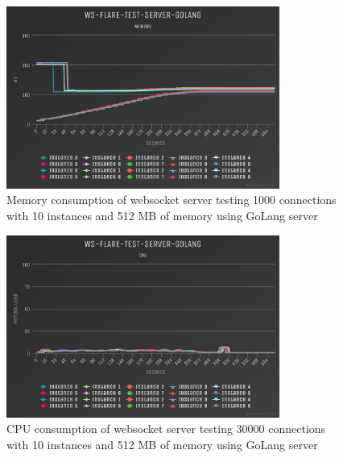 \begin{figure}[H]
  \centering
    \includegraphics[width=0.8\textwidth]{figures/experiments/experiment-1/golang/memory-30000-512-10.png}
    \caption{Memory consumption of websocket server testing 1000 connections with 10 instances and 512 MB of memory using GoLang server}
    \label{fig:experiment-1-golang-memory-30000-512-10}
\end{figure}

\begin{figure}[H]
  \centering
    \includegraphics[width=0.8\textwidth]{figures/experiments/experiment-1/golang/cpu-30000-512-10.png}
    \caption{CPU consumption of websocket server testing 30000 connections with 10 instances and 512 MB of memory using GoLang server}
    \label{fig:experiment-1-golang-cpu-30000-512-10}
\end{figure}

